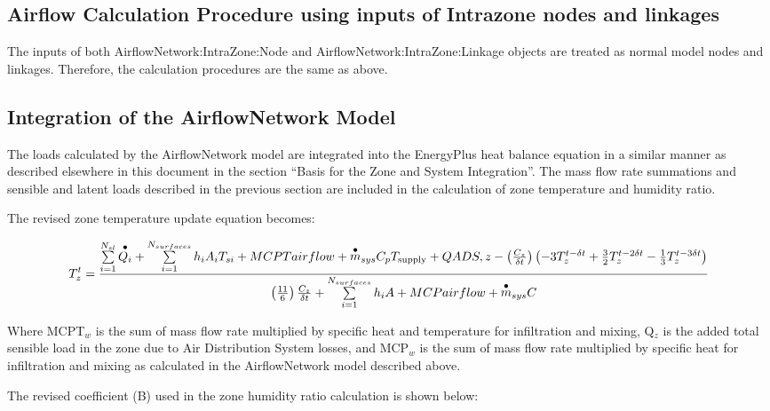 \subsection{Airflow Calculation Procedure using inputs of Intrazone nodes and linkages}\label{airflow-calculation-procedure-using-inputs-of-intrazone-nodes-and-linkages}

The inputs of both AirflowNetwork:IntraZone:Node and AirflowNetwork:IntraZone:Linkage objects are treated as normal model nodes and linkages. Therefore, the calculation procedures are the same as above.

\subsection{Integration of the AirflowNetwork Model}\label{integration-of-the-airflownetwork-model}

The loads calculated by the AirflowNetwork model are integrated into the EnergyPlus heat balance equation in a similar manner as described elsewhere in this document in the section ``Basis for the Zone and System Integration''. The mass flow rate summations and sensible and latent loads described in the previous section are included in the calculation of zone temperature and humidity ratio.

The revised zone temperature update equation becomes:

\begin{equation}
T_z^t = \frac{{\sum\limits_{i = 1}^{{N_{sl}}} {\mathop {{Q_i}}\limits^ \bullet  }  + \sum\limits_{i = 1}^{{N_{surfaces}}} {{h_i}} {A_i}{T_{si}} + MCPTairflow + {{\mathop m\limits^ \bullet  }_{sys}}{C_p}{T_{{\rm{supply}}}} + QADS,z - \left( {\frac{{{C_z}}}{{\delta t}}} \right)\left( { - 3T_z^{t - \delta t} + \frac{3}{2}T_z^{t - 2\delta t} - \frac{1}{3}T_z^{t - 3\delta t}} \right)}}{{\left( {\frac{{11}}{6}} \right)\frac{{{C_z}}}{{\delta t}} + \sum\limits_{i = 1}^{{N_{surfaces}}} {{h_i}} A + MCPairflow + {{\mathop m\limits^ \bullet  }_{sys}}C}}
\end{equation}

Where MCPT\(_{w}\) is the sum of mass flow rate multiplied by specific heat and temperature for infiltration and mixing, Q\(_{z}\) is the added total sensible load in the zone due to Air Distribution System losses, and MCP\(_{w}\) is the sum of mass flow rate multiplied by specific heat for infiltration and mixing as calculated in the AirflowNetwork model described above.

The revised coefficient (B) used in the zone humidity ratio calculation is shown below:

